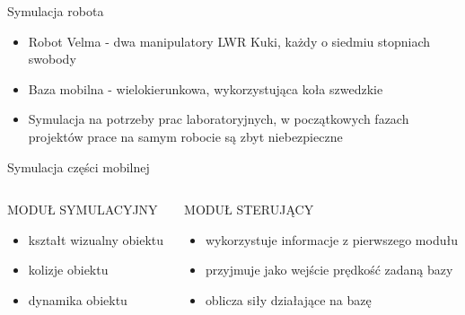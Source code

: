 
\begin{frame}{Symulacja robota}
	\begin{itemize}
		\item Robot Velma - dwa manipulatory LWR Kuki, każdy o siedmiu stopniach swobody
		\item Baza mobilna - wielokierunkowa, wykorzystująca koła szwedzkie
		\item Symulacja na potrzeby prac laboratoryjnych, w początkowych fazach projektów prace na samym robocie są zbyt niebezpieczne
	\end{itemize}
\end{frame}


\begin{frame}{Symulacja części mobilnej}
	\begin{columns}
		\begin{column}{0.5\textwidth}
			\begin{center}
				MODUŁ SYMULACYJNY
			\end{center}
			\begin{itemize}
				\item kształt wizualny obiektu
				\item kolizje obiektu
				\item dynamika obiektu
			\end{itemize}
			
		\end{column}
		\begin{column}{0.5\textwidth}  %
			\begin{center}
				MODUŁ STERUJĄCY
			\end{center}
			\begin{itemize}
				\item wykorzystuje informacje z pierwszego modułu
				\item przyjmuje jako wejście prędkość zadaną bazy
				\item oblicza siły działające na bazę
			\end{itemize}
		\end{column}
	\end{columns}
\end{frame}

